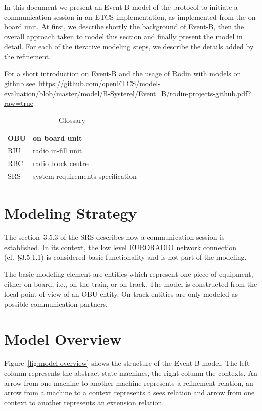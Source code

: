 \documentclass{template/openetcs_article}
\begin{document}
In this document we present an Event-B model of the protocol to initiate a
communication session in an ETCS implementation, as implemented from the
on-board unit. At first, we describe shortly the background of Event-B, then the
overall approach taken to model this section and finally present the model in
detail. For each of the iterative modeling steps, we describe the details added
by the refinement.

For a short introduction on Event-B and the usage of Rodin with models on github
see~\url{https://github.com/openETCS/model-evaluation/blob/master/model/B-Systerel/Event_B/rodin-projects-github.pdf?raw=true}

\begin{table}[ht]
  \centering
  \begin{tabular}[ht]{|l|l|}
    \hline
    OBU & on board unit \\
    \hline
    RIU & radio in-fill unit \\
    \hline
    RBC & radio block centre \\
    \hline
    SRS & system requirements specification \\
    \hline
  \end{tabular}
  \caption{Glossary}
  \label{tab:glossary}
\end{table}

\section{Modeling Strategy}
\label{sec:modeling-strategy}

The section~3.5.3 of the SRS describes how a communication session is
established. In its context, the low level EURORADIO network connection
(cf.~§3.5.1.1) is considered basic functionality and is not part of the
modeling.

The basic modeling element are entities which represent one piece of equipment,
either on-board, i.e., on the train, or on-track. The model is constructed from
the local point of view of an OBU entity. On-track entities are only modeled as
possible communication partners.

\section{Model Overview}
\label{sec:model-overview}

Figure~\ref{fig:model-overview} shows the structure of the Event-B model. The
left column represents the abstract state machines, the right column the
contexts. An arrow from one machine to another machine represents a refinement
relation, an arrow from a machine to a context represents a sees relation and
arrow from one context to another represents an extension relation.
\end{document}
